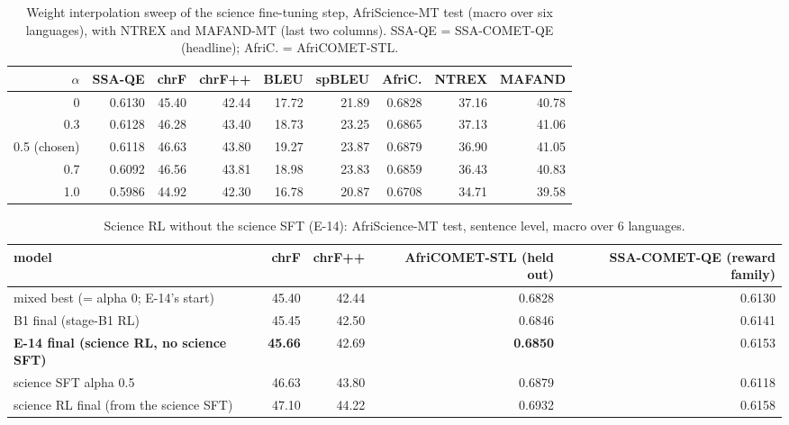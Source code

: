 \begin{table}[t]
\centering\footnotesize
\setlength{\tabcolsep}{4pt}
\caption{Weight interpolation sweep of the science fine-tuning step, AfriScience-MT test (macro over six languages), with NTREX and MAFAND-MT \chrfpp{} (last two columns). SSA-QE = SSA-COMET-QE (headline); AfriC. = AfriCOMET-STL.}\label{tab:alpha}
\begin{adjustbox}{max width=\linewidth}\begin{tabular}{@{}rrrrrrrrr@{}}
\toprule
$\alpha$ & SSA-QE & chrF & chrF++ & BLEU & spBLEU & AfriC. & NTREX & MAFAND \\
\midrule
0 & 0.6130 & 45.40 & 42.44 & 17.72 & 21.89 & 0.6828 & 37.16 & 40.78 \\
0.3 & 0.6128 & 46.28 & 43.40 & 18.73 & 23.25 & 0.6865 & 37.13 & 41.06 \\
0.5 (chosen) & 0.6118 & 46.63 & 43.80 & 19.27 & 23.87 & 0.6879 & 36.90 & 41.05 \\
0.7 & 0.6092 & 46.56 & 43.81 & 18.98 & 23.83 & 0.6859 & 36.43 & 40.83 \\
1.0 & 0.5986 & 44.92 & 42.30 & 16.78 & 20.87 & 0.6708 & 34.71 & 39.58 \\
\bottomrule
\end{tabular}\end{adjustbox}
\end{table}

\begin{table}[t]
\centering\footnotesize
\setlength{\tabcolsep}{4pt}
\caption{Science RL without the science SFT (E-14): AfriScience-MT test, sentence level, macro over 6 languages.}\label{tab:e14a}
\begin{tabularx}{\linewidth}{@{}>{\raggedright\arraybackslash}Xrrrr@{}}
\toprule
model & chrF & chrF++ & AfriCOMET-STL (held out) & SSA-COMET-QE (reward family) \\
\midrule
mixed best (= alpha 0; E-14's start) & 45.40 & 42.44 & 0.6828 & 0.6130 \\
B1 final (stage-B1 RL) & 45.45 & 42.50 & 0.6846 & 0.6141 \\
\textbf{E-14 final (science RL, no science SFT)} & \textbf{45.66} & 42.69 & \textbf{0.6850} & 0.6153 \\
science SFT alpha 0.5 & 46.63 & 43.80 & 0.6879 & 0.6118 \\
science RL final (from the science SFT) & 47.10 & 44.22 & 0.6932 & 0.6158 \\
\bottomrule
\end{tabularx}
\end{table}

